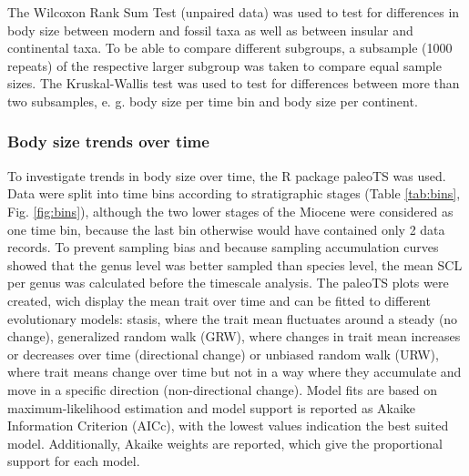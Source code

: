The Wilcoxon Rank Sum Test (unpaired data) was used to test for differences in body size between modern and fossil taxa as well as between insular and continental taxa. To be able to compare different subgroups, a subsample (1000 repeats) of the respective larger subgroup was taken to compare equal sample sizes.
The Kruskal-Wallis test was used to test for differences between more than two subsamples, e. g. body size per time bin and body size per continent.



\subsubsection{Body size trends over time}
To investigate trends in body size over time, the R package paleoTS \citep{Hunt2015a} was used. Data were split into time bins according to stratigraphic stages (Table \ref{tab:bins}, Fig. \ref{fig:bins}), although the two lower stages of the Miocene were considered as one time bin, because the last bin otherwise would have contained only 2 data records. To prevent sampling bias and because sampling accumulation curves showed that the genus level was better sampled than species level, the mean SCL per genus was calculated before the timescale analysis. The paleoTS plots were created, wich display the mean trait over time and can be fitted to different evolutionary models: stasis, where the trait mean fluctuates around a steady (no change), generalized random walk (GRW), where changes in trait mean increases or decreases over time (directional change) or unbiased random walk (URW), where trait means change over time but not in a way where they accumulate and move in a specific direction (non-directional change). Model fits are based on maximum-likelihood estimation and model support is reported as Akaike Information Criterion (AICc), with the lowest values indication the best suited model. Additionally, Akaike weights are reported, which give the proportional support for each model.





